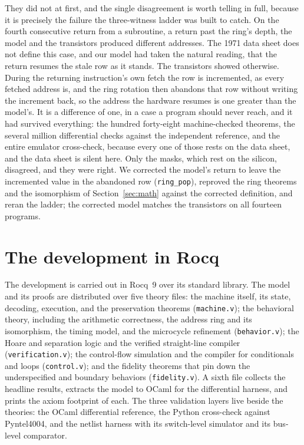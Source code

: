 \documentclass[11pt]{amsart}
\theoremstyle{plain}
\theoremstyle{definition}
\newcommand{\code}[1]{\texttt{#1}}
\begin{document}
They did not at first, and the single disagreement is worth telling in full, because it is precisely the failure the three-witness ladder was built to catch. On the fourth consecutive return from a subroutine, a return past the ring's depth, the model and the transistors produced different addresses. The 1971 data sheet does not define this case, and our model had taken the natural reading, that the return resumes the stale row as it stands. The transistors showed otherwise. During the returning instruction's own fetch the row is incremented, as every fetched address is, and the ring rotation then abandons that row without writing the increment back, so the address the hardware resumes is one greater than the model's. It is a difference of one, in a case a program should never reach, and it had survived everything: the hundred forty-eight machine-checked theorems, the several million differential checks against the independent reference, and the entire emulator cross-check, because every one of those rests on the data sheet, and the data sheet is silent here. Only the masks, which rest on the silicon, disagreed, and they were right. We corrected the model's return to leave the incremented value in the abandoned row (\code{ring\_pop}), reproved the ring theorems and the isomorphism of Section~\ref{sec:math} against the corrected definition, and reran the ladder; the corrected model matches the transistors on all fourteen programs.

\section{The development in Rocq}\label{sec:rocq}

The development \cite{repo} is carried out in Rocq~9 over its standard library. The model and its proofs are distributed over five theory files: the machine itself, its state, decoding, execution, and the preservation theorems (\code{machine.v}); the behavioral theory, including the arithmetic correctness, the address ring and its isomorphism, the timing model, and the microcycle refinement (\code{behavior.v}); the Hoare and separation logic and the verified straight-line compiler (\code{verification.v}); the control-flow simulation and the compiler for conditionals and loops (\code{control.v}); and the fidelity theorems that pin down the underspecified and boundary behaviors (\code{fidelity.v}). A sixth file collects the headline results, extracts the model to OCaml for the differential harness, and prints the axiom footprint of each. The three validation layers live beside the theories: the OCaml differential reference, the Python cross-check against Pyntel4004, and the netlist harness with its switch-level simulator and its bus-level comparator.
\end{document}
